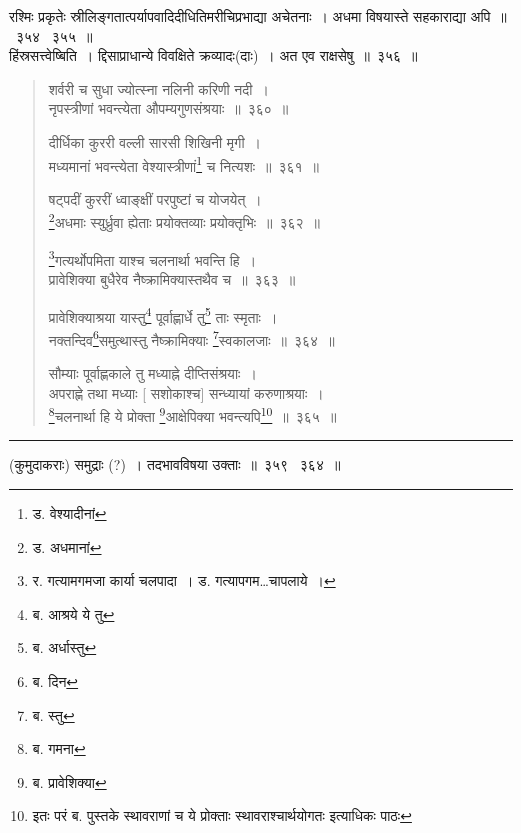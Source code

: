 \documentclass[11pt, openany]{book}
\begin{document}
{\qtt रश्मिः} प्रकृतेः स्रीलिङ्गतात्पर्यापवादिदीधितिमरीचिप्रभाद्या अचेतनाः~। अधमा विषयास्ते सहकाराद्या अपि~॥~३५४ \textendash\ ३५५~॥\\

{\qtt हिंस्रसत्त्वेष्बिति}~। द्दिसाप्राधान्ये विवक्षिते क्रव्यादः(दाः)~। अत एव {\qtt राक्षसेषु}~॥~३५६~॥

\newpage

\begin{quote}
{\na शर्वरी च सुधा ज्योत्स्ना नलिनी करिणी नदी~।\\
 नृपस्त्रीणां भवन्त्येता औपम्यगुणसंश्रयाः~॥~३६०~॥

 दीर्धिका कुररी वल्ली सारसी शिखिनी मृगी~।\\
 मध्यमानां भवन्त्येता वेश्यास्त्रीणां\renewcommand{\thefootnote}{1}\footnote{ड. वेश्यादीनां} च नित्यशः~॥~३६१~॥

 षट्पदीं कुररीं ध्वाङ्क्षीं परपुष्टां च योजयेत्~।\\
 \renewcommand{\thefootnote}{2}\footnote{ड. अधमानां}अधमाः स्युर्ध्रुवा ह्येताः प्रयोक्तव्याः प्रयोक्तृभिः~॥~३६२~॥

 \renewcommand{\thefootnote}{3}\footnote{र. गत्यामगमजा कार्या चलपादा~। ड. गत्यापगम\ldots चापलाये~।}गत्यर्थोपमिता याश्च चलनार्था भवन्ति हि~।\\
 प्रावेशिक्या बुधैरेव नैष्क्रामिक्यास्तथैव च~॥~३६३~॥

 प्रावेशिक्याश्रया यास्तु\renewcommand{\thefootnote}{4}\footnote{ब. आश्रये ये तु} पूर्वाह्णार्धे तु\renewcommand{\thefootnote}{5}\footnote{ब. अर्धास्तु} ताः स्मृताः~।\\
 नक्तन्दिव\renewcommand{\thefootnote}{6}\footnote{ब. दिन}समुत्थास्तु नैष्क्रामिक्याः \renewcommand{\thefootnote}{7}\footnote{ब. स्तु}स्वकालजाः~॥~३६४~॥

 सौम्याः पूर्वाह्णकाले तु मध्याह्ने दीप्तिसंश्रयाः~।\\
 अपराह्णे तथा मध्याः [ सशोकाश्च] सन्ध्यायां करुणाश्रयाः~।\\
 \renewcommand{\thefootnote}{8}\footnote{ब. गमना}चलनार्था हि ये प्रोक्ता \renewcommand{\thefootnote}{9}\footnote{ब. प्रावेशिक्या}आक्षेपिक्या भवन्त्यपि\renewcommand{\thefootnote}{10}\footnote{इतः परं ब. पुस्तके स्थावराणां च ये प्रोक्ताः स्थावराश्चार्थयोगतः इत्याधिकः पाठः}~॥~३६५~॥}
\end{quote}

\hrule

\vspace{2mm}
({\qtt कुमुदाकराः}) समुद्राः (?)~। तदभावविषया उक्ताः~॥~३५९ \textendash\ ३६४~॥\\
\end{document}
